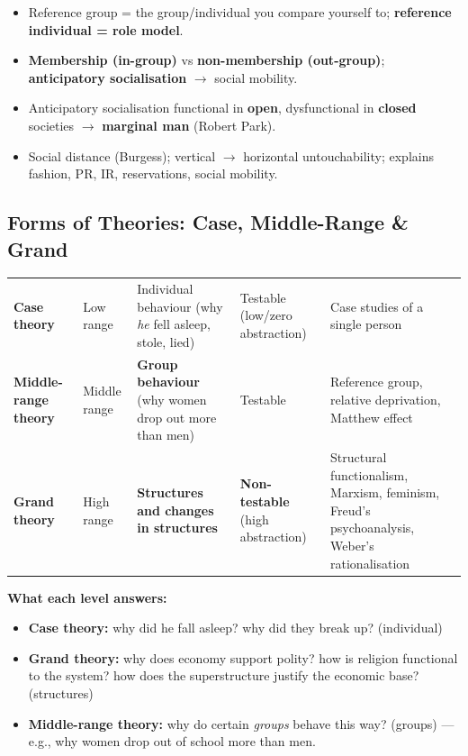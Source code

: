 \begin{QuickRevision}
\begin{itemize}
\item Reference group = the group/individual you compare yourself to; \textbf{reference individual = role model}.
\item \textbf{Membership (in-group)} vs \textbf{non-membership (out-group)}; \textbf{anticipatory socialisation} $\rightarrow$ social mobility.
\item Anticipatory socialisation functional in \textbf{open}, dysfunctional in \textbf{closed} societies $\rightarrow$ \textbf{marginal man} (Robert Park).
\item Social distance (Burgess); vertical $\rightarrow$ horizontal untouchability; explains fashion, PR, IR, reservations, social mobility.
\end{itemize}
\end{QuickRevision}

\sectiondivider

\subsection{Forms of Theories: Case, Middle-Range \& Grand}

\begin{center}
\begin{tabularx}{\textwidth}{p{2.6cm} p{2.2cm} p{3.6cm} p{2.4cm} Y}
 &  &  &  &  \\
\midrule
\textbf{Case theory} & Low range & Individual behaviour (why \textit{he} fell asleep, stole, lied) & Testable (low/zero abstraction) & Case studies of a single person \\
\textbf{Middle-range theory} & Middle range & \textbf{Group behaviour} (why women drop out more than men) & Testable & Reference group, relative deprivation, Matthew effect \\
\textbf{Grand theory} & High range & \textbf{Structures and changes in structures} & \textbf{Non-testable} (high abstraction) & Structural functionalism, Marxism, feminism, Freud's psychoanalysis, Weber's rationalisation \\
\bottomrule
\end{tabularx}
\end{center}

\begin{KeyConcept}
\textbf{What each level answers:}
\begin{itemize}
\item \textbf{Case theory:} why did he fall asleep? why did they break up? (individual)
\item \textbf{Grand theory:} why does economy support polity? how is religion functional to the system? how does the superstructure justify the economic base? (structures)
\item \textbf{Middle-range theory:} why do certain \textit{groups} behave this way? (groups) --- e.g., why women drop out of school more than men.
\end{itemize}
\end{KeyConcept}


